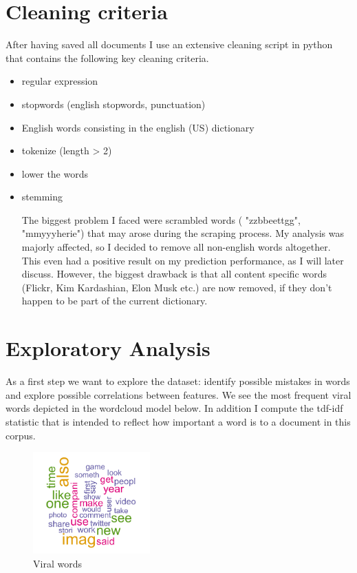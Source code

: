 \documentclass[twoside,twocolumn]{article}
\begin{document}
\section{Cleaning criteria}
After having saved all documents I use an extensive cleaning script in python that contains the following key cleaning criteria.

\begin{itemize}

\item regular expression 
\item stopwords (english stopwords, punctuation)
\item English words consisting in the english (US) dictionary
\item tokenize (length > 2)
\item lower the words
\item stemming

The biggest problem I faced were scrambled words ( "zzbbeettgg", "mmyyyherie") that may arose during the scraping process. My analysis was majorly affected, so I decided to remove all non-english words altogether. This even had a positive result  on my prediction performance, as I will later discuss. However, the biggest drawback is that all content specific words (Flickr, Kim Kardashian, Elon Musk etc.) are now removed, if they don't happen to be part of the current dictionary.
\end{itemize}

\section{Exploratory Analysis}
As a first step we want to explore the dataset: identify possible mistakes in words and explore possible correlations between features. We see the most frequent viral words depicted in the wordcloud model below. In addition I compute the tdf-idf statistic that is intended to reflect how important a word is to a document in this corpus.
\begin{figure}[!htb]
  \caption{Viral words}
  \centering
    \includegraphics[width=0.4\textwidth]{viral.png}
\end{figure}
\end{document}
